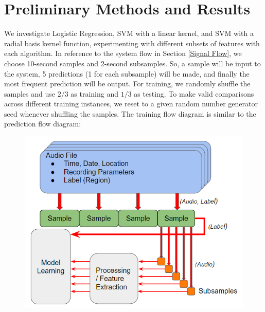 \documentclass[journal]{IEEEtran}
\begin{document}
\section{Preliminary Methods and Results}
We investigate Logistic Regression, SVM with a linear kernel, and SVM with a radial basis kernel function, experimenting with different subsets of features with each algorithm. In reference to the system flow in Section \ref{Signal Flow}, we choose 10-second samples and 2-second subsamples. So, a sample will be input to the system, 5 predictions (1 for each subsample) will be made, and finally the most frequent prediction will be output.  For training, we randomly shuffle the samples and use $2/3$ as training and $1/3$ as testing. To make valid comparisons across different training instances, we reset to a given random number generator seed whenever shuffling the samples. The training flow diagram is similar to the prediction flow diagram:
\begin{figure}[H]
\centering
\includegraphics[width=0.9\linewidth]{train_flow}
\end{figure}
\end{document}
